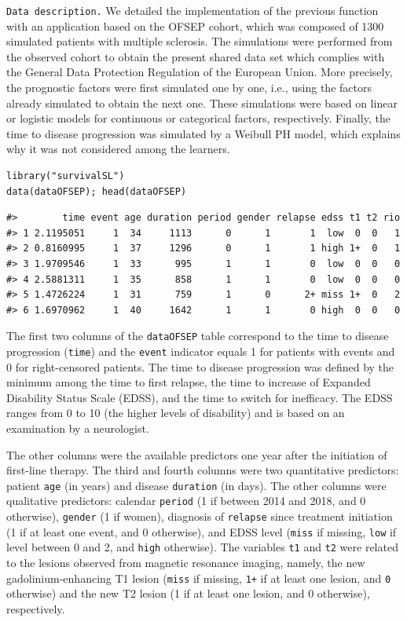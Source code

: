 \texttt{Data\ description.} We detailed the implementation of the previous function with an application based on the OFSEP cohort, which was composed of 1300 simulated patients with multiple sclerosis. The simulations were performed from the observed cohort to obtain the present shared data set which complies with the General Data Protection Regulation of the European Union. More precisely, the prognostic factors were first simulated one by one, i.e., using the factors already simulated to obtain the next one. These simulations were based on linear or logistic models for continuous or categorical factors, respectively. Finally, the time to disease progression was simulated by a Weibull PH model, which explains why it was not considered among the learners.

\begin{verbatim}
library("survivalSL")
data(dataOFSEP); head(dataOFSEP)
\end{verbatim}

\begin{verbatim}
#>        time event age duration period gender relapse edss t1 t2 rio
#> 1 2.1195051     1  34     1113      0      1       1  low  0  0   1
#> 2 0.8160995     1  37     1296      0      1       1 high 1+  0   1
#> 3 1.9709546     1  33      995      1      1       0  low  0  0   0
#> 4 2.5881311     1  35      858      1      1       0  low  0  0   0
#> 5 1.4726224     1  31      759      1      0      2+ miss 1+  0   2
#> 6 1.6970962     1  40     1642      1      1       0 high  0  0   0
\end{verbatim}

The first two columns of the \texttt{dataOFSEP} table correspond to the time to disease progression (\texttt{time}) and the \texttt{event} indicator equals 1 for patients with events and 0 for right-censored patients. The time to disease progression was defined by the minimum among the time to first relapse, the time to increase of Expanded Disability Status Scale (EDSS), and the time to switch for inefficacy. The EDSS ranges from 0 to 10 (the higher levels of disability) and is based on an examination by a neurologist.

The other columns were the available predictors one year after the initiation of first-line therapy. The third and fourth columns were two quantitative predictors: patient \texttt{age} (in years) and disease \texttt{duration} (in days). The other columns were qualitative predictors: calendar \texttt{period} (1 if between 2014 and 2018, and 0 otherwise), \texttt{gender} (1 if women), diagnosis of \texttt{relapse} since treatment initiation (1 if at least one event, and 0 otherwise), and EDSS level (\texttt{miss} if missing, \texttt{low} if level between 0 and 2, and \texttt{high} otherwise). The variables \texttt{t1} and \texttt{t2} were related to the lesions observed from magnetic resonance imaging, namely, the new gadolinium-enhancing T1 lesion (\texttt{miss} if missing, \texttt{1+} if at least one lesion, and \texttt{0} otherwise) and the new T2 lesion (1 if at least one lesion, and 0 otherwise), respectively.

